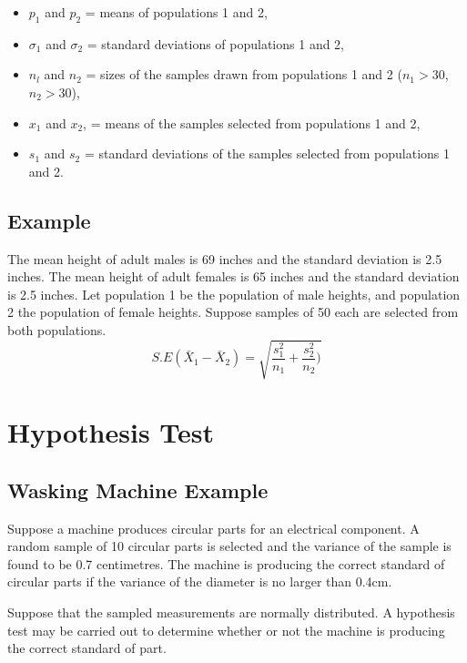 \begin{itemize}
	\item $p_1$ and $p_2$ = means of populations 1 and 2,
	
	\item $\sigma_1$ and $\sigma_2$ = standard deviations of
	populations 1 and 2,
	
	\item $n_l$ and $n_2$ = sizes of the samples drawn from
	populations 1 and 2 ($n_1 >30 $, $n_2 >30 $),
	
	\item $x_1$ and $x_2$, = means of the samples selected from
	populations 1 and 2,
	
	\item $s_{1}$ and $s_{2}$ = standard deviations of the samples
	selected from populations 1 and 2.
	
\end{itemize}
\subsection{Example}
The mean height of adult males is 69 inches and the standard
deviation is 2.5 inches. The mean height of adult females is 65
inches and the standard deviation is 2.5 inches. Let population 1
be the population of male heights, and population 2 the population
of female heights. Suppose samples of 50 each are selected from
both populations.
\begin{equation}
S.E(\bar{X}_{1}-\bar{X}_{2}) =
\sqrt{\frac{s^2_{1}}{n_{1}}+\frac{s^2_{2}}{n_{2}})}
\end{equation}


	\section{Hypothesis Test}
	\subsection{Wasking Machine Example}%
	Suppose a machine produces circular parts for an electrical component. A random sample of 10 circular parts is selected and the variance of the sample is found to be 0.7 centimetres. The machine is producing the correct standard of circular parts if the variance of the diameter is no larger than 0.4cm.
	
	Suppose that the sampled measurements are normally distributed. A hypothesis test may be carried out to determine whether or not the machine is producing the correct standard of part.
	
